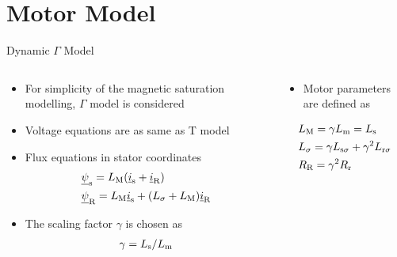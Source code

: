 \documentclass[11pt,aspectratio=169]{beamer}
\begin{document}
\section{Motor Model}
\begin{frame}{Dynamic $\Gamma$ Model}
\begin{columns}
	\begin{column}{.43\textwidth}
		\begin{itemize}
		\item For simplicity of the magnetic saturation modelling, $\Gamma$ model is considered 
			\item Voltage equations are as same as T model
			\item Flux equations in stator coordinates
				\begin{align*}
			&\underline{\psi}_{\text{s}}=L_{\text{M}}(\underline{i}_{\text{s}}+\underline{i}_{\text{R}})\\
			&\underline{\psi}_{\text{R}}=L_{\text{M}}\underline{i}_{\text{s}}+(L_\sigma+L_{\text{M}})\underline{i}_{\text{R}}
			\end{align*}
			\item The scaling factor $\gamma$ is chosen as
			\begin{align*}
	     	\gamma=L_{\text{s}}/L_{\text{m}}
			\end{align*}
		\end{itemize}
	\end{column}
\begin{column}{.53\textwidth}
	
	\begin{center}
		\small
		
	\end{center}
\begin{itemize}
	\item Motor parameters are defined as
	\end{itemize}
	\begin{align*}
&L_{\text{M}}=\gamma L_{\text{m}}=L_{\text{s}}\\
&L_\sigma=\gamma L_{\text{s}\sigma}+\gamma^{2}L_{\text{r}\sigma}\\
&R_{\text{R}}=\gamma^{2}R_{\text{r}}
\end{align*}
\end{column}
\end{columns}

\end{frame}



\end{document}
